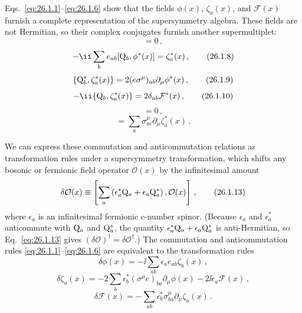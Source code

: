 Eqs.~\eqref{eq:26.1.1}--\eqref{eq:26.1.6} show that the fields
\(\phi(x)\), \(\zeta_a(x)\), and \(\mathcal{F}(x)\) furnish a complete
representation of the supersymmetry algebra. These fields are not Hermitian,
so their complex conjugates furnish another supermultiplet:
\begin{equation}
  [\WeylQ_a^*,\phi^*(x)]=0\,,
  \tag{26.1.7}\label{eq:26.1.7}
\end{equation}
\begin{equation}
  -\ii\sum_b e_{ab}[\WeylQ_b,\phi^*(x)]=\zeta_a^*(x)\,,
  \tag{26.1.8}\label{eq:26.1.8}
\end{equation}
\begin{equation}
  \{\mathrm{Q}_b^*,\zeta_a^*(x)\}
  =2(e\sigma^\mu)_{ab}\partial_\mu\phi^*(x)\,,
  \tag{26.1.9}\label{eq:26.1.9}
\end{equation}
\begin{equation}
  -\ii\{\WeylQ_b,\zeta_a^*(x)\}
  =2\delta_{ab}\mathcal{F}^*(x)\,,
  \tag{26.1.10}\label{eq:26.1.10}
\end{equation}
\begin{equation}
  [\WeylQ_c,\mathcal{F}^*(x)]=0\,,
  \tag{26.1.11}\label{eq:26.1.11}
\end{equation}
\begin{equation}
  [\WeylQ_c^*,\mathcal{F}^*(x)]
  =\sum_a\sigma^\mu_{ac}\partial_\mu\zeta_a^*(x)\,.
  \tag{26.1.12}\label{eq:26.1.12}
\end{equation}

We can express these commutation and anticommutation relations as
transformation rules under a supersymmetry transformation, which shifts any
bosonic or fermionic field operator \(\mathcal{O}(x)\) by the infinitesimal
amount
\begin{equation}
  \delta\mathcal{O}(x)
  \equiv
  \left[\sum_a\left(\epsilon_a^*\mathrm{Q}_a
    +\epsilon_a\mathrm{Q}_a^*\right),\mathcal{O}(x)\right]\,,
  \tag{26.1.13}\label{eq:26.1.13}
\end{equation}
where \(\epsilon_a\) is an infinitesimal fermionic c-number spinor. (Because
\(\epsilon_a\) and \(\epsilon_a^*\) anticommute with \(\mathrm{Q}_a\) and
\(\mathrm{Q}_a^*\), the quantity
\(\epsilon_a^*\mathrm{Q}_a+\epsilon_a\mathrm{Q}_a^*\) is anti-Hermitian, so
Eq.~\eqref{eq:26.1.13} gives
\((\delta\mathcal{O})^\dagger=\delta\mathcal{O}^\dagger\).) The commutation
and anticommutation rules \eqref{eq:26.1.1}--\eqref{eq:26.1.6} are
equivalent to the transformation rules
\begin{equation}
  \delta\phi(x)
  =-\ii\sum_{ab}\epsilon_a e_{ab}\zeta_b(x)\,,
  \tag{26.1.14}\label{eq:26.1.14}
\end{equation}
\begin{equation}
  \delta\zeta_a(x)
  =-2\sum_b\epsilon_b^*(\sigma^\mu e)_{ba}\partial_\mu\phi(x)
    -2\ii\epsilon_a\mathcal{F}(x)\,,
  \tag{26.1.15}\label{eq:26.1.15}
\end{equation}
\begin{equation}
  \delta\mathcal{F}(x)
  =-\sum_{ab}\epsilon_b^*\sigma^\mu_{ba}\partial_\mu\zeta_a(x)\,.
  \tag{26.1.16}\label{eq:26.1.16}
\end{equation}

